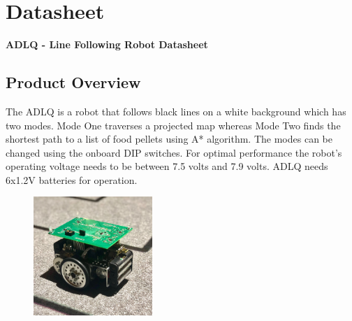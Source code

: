 \newpage
\section{Datasheet}
\vspace{1mm}
\Large \textbf{ADLQ - Line Following Robot Datasheet}

\begin{multicols}{2}

\subsection*{Product Overview}
\vspace{-2mm}
The ADLQ is a robot that follows black lines on a white background which has two modes. Mode One traverses a projected map whereas Mode Two finds the shortest path to a list of food pellets using A* algorithm. The modes can be changed using the onboard DIP switches. For optimal performance the robot’s operating voltage needs to be between 7.5 volts and 7.9 volts. ADLQ needs 6x1.2V batteries for operation.

\begin{figure}[H]
\centering
\includegraphics[width=0.4\textwidth]{figures/robot_img.JPG}
\end{figure}
\end{multicols}


